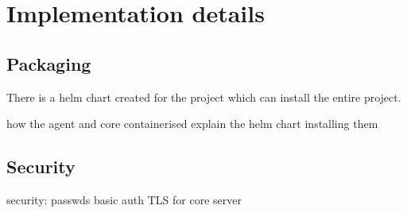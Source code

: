 \setlength{\parindent}{0pt}
\setlength{\parskip}{0.6em}

\chapter[Implementation]{Implementation details}
\label{chap:implementation}






  

\section{Packaging}

There is a helm chart created for the project which can install the entire project.

how the agent and core containerised
explain the helm chart installing them



\section{Security}
security:
    passwds
        basic auth
    TLS for core server 




